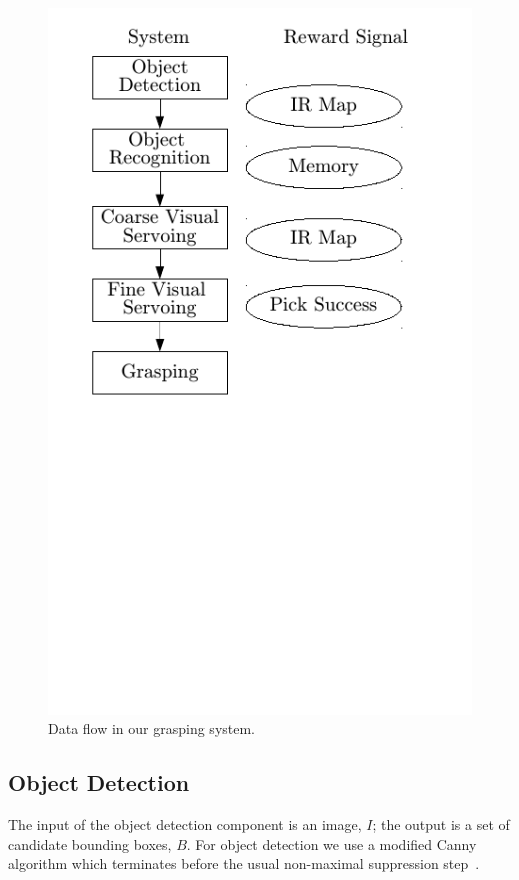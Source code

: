 \documentclass{article}
\begin{document}
\begin{figure}
\includegraphics{system.pdf}
\caption{Data flow in our grasping system.\label{fig:system}}
\end{figure}

\subsection{Object Detection}
\label{sec:detection}

The input of the object detection component is an image, $I$; the
output is a set of candidate bounding boxes, $B$.  For object
detection we use a modified Canny algorithm which terminates before
the usual non-maximal suppression step~\citep{canny86}.

\end{document}
